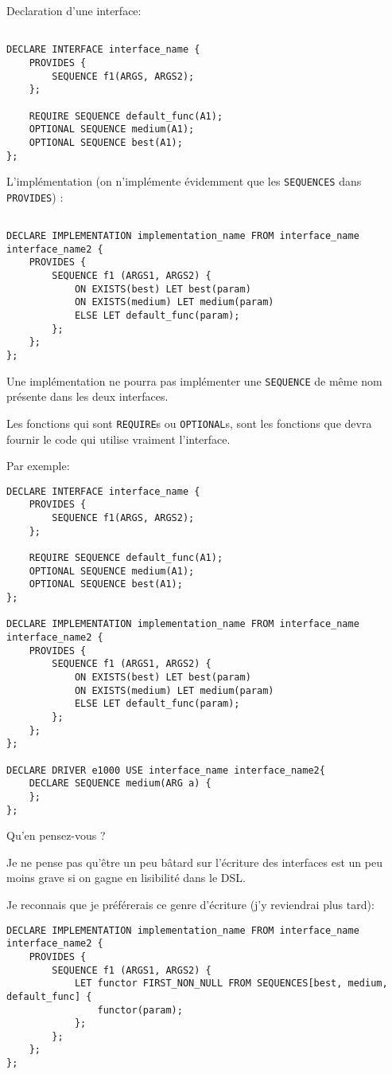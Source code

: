 \documentclass{rtxreport}
\begin{document}
Declaration d'une interface:

\begin{lstlisting}

DECLARE INTERFACE interface_name {
	PROVIDES {
		SEQUENCE f1(ARGS, ARGS2);
	};

	REQUIRE SEQUENCE default_func(A1);
	OPTIONAL SEQUENCE medium(A1);
	OPTIONAL SEQUENCE best(A1);
};

\end{lstlisting}

L’implémentation (on n’implémente évidemment que les \texttt{SEQUENCES} dans \texttt{PROVIDES}) :
\begin{lstlisting}

DECLARE IMPLEMENTATION implementation_name FROM interface_name interface_name2 {
	PROVIDES {
		SEQUENCE f1 (ARGS1, ARGS2) {
			ON EXISTS(best) LET best(param)
			ON EXISTS(medium) LET medium(param)
			ELSE LET default_func(param);
		};
	};
};
\end{lstlisting}
Une implémentation ne pourra pas implémenter une \texttt{SEQUENCE} de même nom présente dans les deux interfaces.

Les fonctions qui sont \texttt{REQUIRE}s ou \texttt{OPTIONAL}s, sont les fonctions que devra fournir le code qui utilise vraiment l’interface.

Par exemple:

\begin{lstlisting}
DECLARE INTERFACE interface_name {
	PROVIDES {
		SEQUENCE f1(ARGS, ARGS2);
	};

	REQUIRE SEQUENCE default_func(A1);
	OPTIONAL SEQUENCE medium(A1);
	OPTIONAL SEQUENCE best(A1);
};

DECLARE IMPLEMENTATION implementation_name FROM interface_name interface_name2 {
	PROVIDES {
		SEQUENCE f1 (ARGS1, ARGS2) {
			ON EXISTS(best) LET best(param)
			ON EXISTS(medium) LET medium(param)
			ELSE LET default_func(param);
		};
	};
};

DECLARE DRIVER e1000 USE interface_name interface_name2{
	DECLARE SEQUENCE medium(ARG a) {
	};
};
\end{lstlisting}
Qu’en pensez-vous ?

Je ne pense pas qu’être un peu bâtard sur l’écriture des interfaces est un peu moins grave si on gagne en lisibilité dans le DSL.

Je reconnais que je préférerais ce genre d’écriture (j'y reviendrai plus tard):

\begin{lstlisting}
DECLARE IMPLEMENTATION implementation_name FROM interface_name interface_name2 {
	PROVIDES {
		SEQUENCE f1 (ARGS1, ARGS2) {
			LET functor FIRST_NON_NULL FROM SEQUENCES[best, medium, default_func] {
				functor(param);
			};
		};
	};
};
\end{lstlisting}
\end{document}
